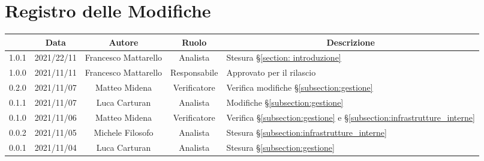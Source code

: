 \thispagestyle{empty}
\section*{Registro delle Modifiche}

\begin{center}
	\renewcommand{\arraystretch}{1.8}
	\begin{longtable}[c]{c | c | c | c | p{5cm}}
		\rowcolor[HTML]{125E28}
		\multicolumn{1}{c}{\color[HTML]{FFFFFF} \textbf{Versione}} & 
		\multicolumn{1}{c}{\color[HTML]{FFFFFF} \textbf{Data}} & 
		\multicolumn{1}{c}{\color[HTML]{FFFFFF} \textbf{Autore}} & 
		\multicolumn{1}{c}{\color[HTML]{FFFFFF} \textbf{Ruolo}} & 
		\multicolumn{1}{c}{\color[HTML]{FFFFFF} \textbf{Descrizione}} \\
		\endhead
		1.0.1 & 2021/22/11 & Francesco Mattarello & Analista & Stesura §\ref{section: introduzione}\\
		1.0.0 & 2021/11/11 & Francesco Mattarello & Responsabile & Approvato per il rilascio\\
		0.2.0 & 2021/11/07 & Matteo Midena & Verificatore & Verifica modifiche §\ref{subsection:gestione}\\
		0.1.1 & 2021/11/07 & Luca Carturan & Analista & Modifiche §\ref{subsection:gestione}\\
		0.1.0 & 2021/11/06 & Matteo Midena & Verificatore & Verifica  §\ref{subsection:gestione} e  §\ref{subsection:infrastrutture_interne}\\
		0.0.2 & 2021/11/05 & Michele Filosofo & Analista & Stesura §\ref{subsection:infrastrutture_interne}\\
		0.0.1 & 2021/11/04 & Luca Carturan & Analista &Stesura §\ref{subsection:gestione}  \\

	\end{longtable}
\end{center}